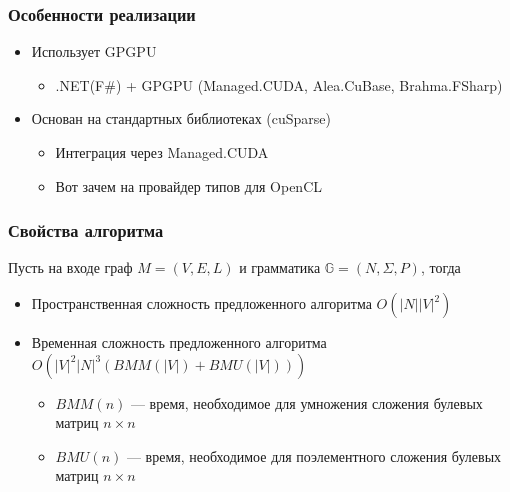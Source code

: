 \documentclass[xcolor=table,aspectratio=169]{beamer}
\begin{document}
\begin{frame}[fragile]
  \transwipe[direction=90]
  \frametitle{Особенности реализации}

\begin{itemize} 
\item Использует GPGPU
\begin{itemize}     
  \item .NET(F\#) + GPGPU (Managed.CUDA, Alea.CuBase, Brahma.FSharp)
\end{itemize}
\item Основан на стандартных библиотеках (cuSparse)
\begin{itemize}     
  \item Интеграция через Managed.CUDA
  \item Вот зачем на провайдер типов для OpenCL 
\end{itemize}
\end{itemize}
\end{frame}


\begin{frame}
  \transwipe[direction=90]
  \frametitle{Свойства алгоритма}

Пусть на входе граф $M=(V,E,L)$ и грамматика $\mathbb{G} = (N, \Sigma, P)$, тогда
\begin{itemize} 
\item Пространственная сложность предложенного алгоритма $O(|N||V|^2)$
\item Временная сложность предложенного алгоритма $O(|V|^2 |N|^3(BMM(|V|) + BMU (|V|)))$
\begin{itemize} 
\item $BMM(n)$ --- время, необходимое для умножения сложения булевых матриц $n\times n$
\item $BMU(n)$ --- время, необходимое для поэлементного сложения булевых матриц $n\times n$
\end{itemize}

\end{itemize}

\end{frame}
\end{document}

